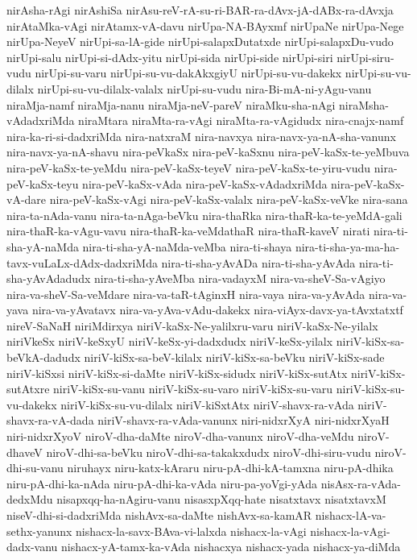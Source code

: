 {nirAsha-rAgi
nirAshiSa
nirAsu-reV-rA-su-ri-BAR-ra-dAvx-jA-dABx-ra-dAvxja
nirAtaMka-vAgi
nirAtamx-vA-davu
nirUpa-NA-BAyxmf
nirUpaNe
nirUpa-Nege
nirUpa-NeyeV
nirUpi-sa-lA-gide
nirUpi-salapxDutatxde
nirUpi-salapxDu-vudo
nirUpi-salu
nirUpi-si-dAdx-yitu
nirUpi-sida
nirUpi-side
nirUpi-siri
nirUpi-siru-vudu
nirUpi-su-varu
nirUpi-su-vu-dakAkxgiyU
nirUpi-su-vu-dakekx
nirUpi-su-vu-dilalx
nirUpi-su-vu-dilalx-valalx
nirUpi-su-vudu
nira-Bi-mA-ni-yAgu-vanu
niraMja-namf
niraMja-nanu
niraMja-neV-pareV
niraMku-sha-nAgi
niraMsha-vAdadxriMda
niraMtara
niraMta-ra-vAgi
niraMta-ra-vAgidudx
nira-cnajx-namf
nira-ka-ri-si-dadxriMda
nira-natxraM
nira-navxya
nira-navx-ya-nA-sha-vanunx
nira-navx-ya-nA-shavu
nira-peVkaSx
nira-peV-kaSxnu
nira-peV-kaSx-te-yeMbuva
nira-peV-kaSx-te-yeMdu
nira-peV-kaSx-teyeV
nira-peV-kaSx-te-yiru-vudu
nira-peV-kaSx-teyu
nira-peV-kaSx-vAda
nira-peV-kaSx-vAdadxriMda
nira-peV-kaSx-vA-dare
nira-peV-kaSx-vAgi
nira-peV-kaSx-valalx
nira-peV-kaSx-veVke
nira-sana
nira-ta-nAda-vanu
nira-ta-nAga-beVku
nira-thaRka
nira-thaR-ka-te-yeMdA-gali
nira-thaR-ka-vAgu-vavu
nira-thaR-ka-veMdathaR
nira-thaR-kaveV
nirati
nira-ti-sha-yA-naMda
nira-ti-sha-yA-naMda-veMba
nira-ti-shaya
nira-ti-sha-ya-ma-ha-tavx-vuLaLx-dAdx-dadxriMda
nira-ti-sha-yAvADa
nira-ti-sha-yAvAda
nira-ti-sha-yAvAdadudx
nira-ti-sha-yAveMba
nira-vadayxM
nira-va-sheV-Sa-vAgiyo
nira-va-sheV-Sa-veMdare
nira-va-taR-tAginxH
nira-vaya
nira-va-yAvAda
nira-va-yava
nira-va-yAvatavx
nira-va-yAva-vAdu-dakekx
nira-viAyx-davx-ya-tAvxtatxtf
nireV-SaNaH
niriMdirxya
niriV-kaSx-Ne-yalilxru-varu
niriV-kaSx-Ne-yilalx
niriVkeSx
niriV-keSxyU
niriV-keSx-yi-dadxdudx
niriV-keSx-yilalx
niriV-kiSx-sa-beVkA-dadudx
niriV-kiSx-sa-beV-kilalx
niriV-kiSx-sa-beVku
niriV-kiSx-sade
niriV-kiSxsi
niriV-kiSx-si-daMte
niriV-kiSx-sidudx
niriV-kiSx-sutAtx
niriV-kiSx-sutAtxre
niriV-kiSx-su-vanu
niriV-kiSx-su-varo
niriV-kiSx-su-varu
niriV-kiSx-su-vu-dakekx
niriV-kiSx-su-vu-dilalx
niriV-kiSxtAtx
niriV-shavx-ra-vAda
niriV-shavx-ra-vA-dada
niriV-shavx-ra-vAda-vanunx
niri-nidxrXyA
niri-nidxrXyaH
niri-nidxrXyoV
niroV-dha-daMte
niroV-dha-vanunx
niroV-dha-veMdu
niroV-dhaveV
niroV-dhi-sa-beVku
niroV-dhi-sa-takakxdudx
niroV-dhi-siru-vudu
niroV-dhi-su-vanu
niruhayx
niru-katx-kAraru
niru-pA-dhi-kA-tamxna
niru-pA-dhika
niru-pA-dhi-ka-nAda
niru-pA-dhi-ka-vAda
niru-pa-yoVgi-yAda
nisAsx-ra-vAda-dedxMdu
nisapxqq-ha-nAgiru-vanu
nisasxpXqq-hate
nisatxtavx
nisatxtavxM
niseV-dhi-si-dadxriMda
nishAvx-sa-daMte
nishAvx-sa-kamAR
nishacx-lA-va-sethx-yanunx
nishacx-la-savx-BAva-vi-lalxda
nishacx-la-vAgi
nishacx-la-vAgi-dadx-vanu
nishacx-yA-tamx-ka-vAda
nishacxya
nishacx-yada
nishacx-ya-diMda
}
